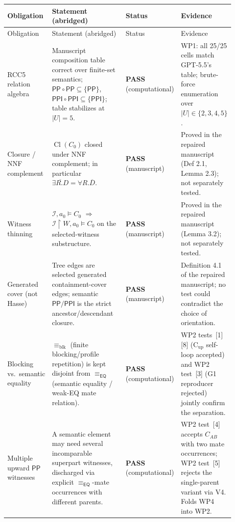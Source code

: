 \documentclass[11pt]{article}
\newcommand{\Cl}{\operatorname{Cl}}
\newcommand{\EQ}{\mathsf{EQ}}
\newcommand{\PP}{\mathsf{PP}}
\newcommand{\PPI}{\mathsf{PPI}}
\newcommand{\blk}{\equiv_{\mathrm{blk}}}
\newcommand{\eqrel}{\equiv_{\EQ}}
\newcommand{\PASS}{\textcolor{black!70!green}{\textbf{PASS}}}
\begin{document}
\begin{center}\small
\begin{longtable}{p{0.18\linewidth} p{0.40\linewidth} p{0.13\linewidth} p{0.21\linewidth}}
\toprule
Obligation & Statement (abridged) & Status & Evidence \\
\midrule
\endfirsthead
\toprule
Obligation & Statement (abridged) & Status & Evidence \\
\midrule
\endhead
\bottomrule
\endfoot

RCC5 relation algebra
  & Manuscript composition table correct over finite-set semantics;
    \(\PP\circ\PP \subseteq \{\PP\}\), \(\PPI\circ\PPI \subseteq \{\PPI\}\); table
    stabilizes at \(|U|=5\).
  & \PASS{} (computational)
  & WP1: all 25/25 cells match GPT-5.5's table; brute-force
    enumeration over \(|U| \in \{2,3,4,5\}\). \\

Closure / NNF complement
  & \(\Cl(C_0)\) closed under NNF complement; in particular
    \(\overline{\exists R.D} = \forall R.\overline D\).
  & \PASS{} (manuscript)
  & Proved in the repaired manuscript (Def 2.1, Lemma 2.3);
    not separately tested. \\

Witness thinning
  & \(\mathcal I, a_0 \models C_0\)
    \(\Rightarrow\) \(\mathcal I\upharpoonright W, a_0 \models C_0\)
    on the selected-witness substructure.
  & \PASS{} (manuscript)
  & Proved in the repaired manuscript (Lemma 3.2);
    not separately tested. \\

Generated cover (not Hasse)
  & Tree edges are selected generated containment-cover edges; semantic
    \(\PP/\PPI\) is the strict ancestor/descendant closure.
  & \PASS{} (manuscript)
  & Definition 4.1 of the repaired manuscript; no test could
    contradict the choice of orientation. \\

Blocking vs.\ semantic equality
  & \(\blk\) (finite blocking/profile repetition) is kept disjoint
    from \(\eqrel\) (semantic equality / weak-EQ mate relation).
  & \PASS{} (computational)
  & WP2 tests~[1][8] (C\(_{\mathrm{up}}\) self-loop accepted) and
    WP2 test~[3] (G1 reproducer rejected) jointly confirm the
    separation. \\

Multiple upward \(\PP\) witnesses
  & A semantic element may need several incomparable superpart
    witnesses, discharged via explicit \(\eqrel\)-mate
    occurrences with different parents.
  & \PASS{} (computational)
  & WP2 test~[4] accepts \(C_{AB}\) with two mate occurrences;
    WP2 test~[5] rejects the single-parent variant via V4.
    Folds WP4 into WP2. \\


\end{longtable}
\end{center}
\end{document}
